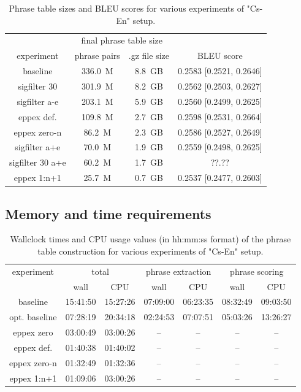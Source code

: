 \begin{table}[ht]
\centering
\begin{tabular}{ | c | c c | c | }
\hline
 & \multicolumn{2}{|c|}{final phrase table size} & \\
experiment & phrase pairs & .gz file size & BLEU score \\
\hline
\hline
baseline          & 336.0~M & 8.8~GB & 0.2583 [0.2521, 0.2646] \\
sigfilter 30      & 301.9~M & 8.2~GB & 0.2562 [0.2503, 0.2627] \\
sigfilter a-e     & 203.1~M & 5.9~GB & 0.2560 [0.2499, 0.2625] \\
eppex def.        & 109.8~M & 2.7~GB & 0.2598 [0.2531, 0.2664] \\
eppex zero-n      &  86.2~M & 2.3~GB & 0.2586 [0.2527, 0.2649] \\
sigfilter a+e     &  70.0~M & 1.9~GB & 0.2559 [0.2498, 0.2625] \\
sigfilter 30 a+e  &  60.2~M & 1.7~GB & ??.?? \\ %
eppex 1:n+1       &  25.7~M & 0.7~GB & 0.2537 [0.2477, 0.2603] \\
\hline
\end{tabular}
\caption{\label{cs-en-wmt13-pt-size-and-bleu}
Phrase table sizes and BLEU scores for various experiments of "Cs-En" setup.}
\end{table}

\subsection{Memory and time requirements}

\begin{table}[ht]
\centering
\begin{tabular}{ | c | c c | c c | c c | }
\hline
experiment & \multicolumn{2}{|c|}{total} & \multicolumn{2}{|c|}{phrase extraction} & \multicolumn{2}{|c|}{phrase scoring} \\
 & wall & CPU & wall & CPU & wall & CPU \\
\hline
\hline
baseline      & 15:41:50 & 15:27:26 & 07:09:00 & 06:23:35 & 08:32:49 & 09:03:50 \\
opt. baseline & 07:28:19 & 20:34:18 & 02:24:53 & 07:07:51 & 05:03:26 & 13:26:27 \\
eppex zero    & 03:00:49 & 03:00:26 & -- & -- & -- & -- \\
\hline
eppex def.    & 01:40:38 & 01:40:02 & -- & -- & -- & -- \\
eppex zero-n  & 01:32:49 & 01:32:36 & -- & -- & -- & -- \\
eppex 1:n+1   & 01:09:06 & 03:00:26 & -- & -- & -- & -- \\
\hline
\end{tabular}
\caption{\label{cs-en-wmt13-time-benchmarks}
Wallclock times and CPU usage values (in hh:mm:ss format) of the phrase table
construction for various experiments of "Cs-En" setup.}
\end{table}


